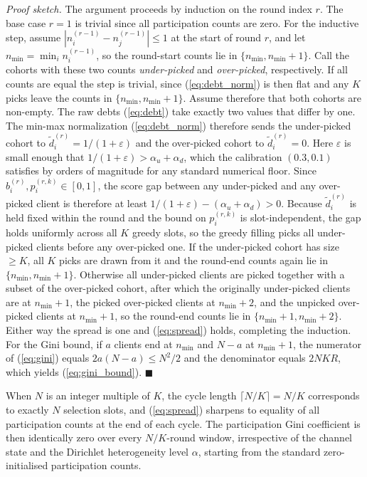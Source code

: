 \documentclass[journal]{IEEEtran}
\newcommand{\revIVE}[1]{#1}
\newcommand{\rev}[1]{{\color{blue}#1}}
\begin{document}
\textit{Proof sketch.} The argument proceeds by induction on the round index $r$. The base case $r = 1$ is trivial since all participation counts are zero. For the inductive step, assume $|n_i^{(r-1)} - n_j^{(r-1)}| \le 1$ at the start of round $r$, and let $n_{\min} = \min_i n_i^{(r-1)}$, so the round-start counts lie in $\{n_{\min}, n_{\min}+1\}$. Call the cohorts with these two counts \emph{under-picked} and \emph{over-picked}, respectively. \rev{If all counts are equal the step is trivial, since (\ref{eq:debt_norm}) is then flat and any $K$ picks leave the counts in $\{n_{\min}, n_{\min}+1\}$. Assume therefore that both cohorts are non-empty.} The raw debts (\ref{eq:debt}) take exactly two values that differ by one. The min-max normalization (\ref{eq:debt_norm}) therefore sends the under-picked cohort to $\tilde{d}_i^{(r)} = 1/(1+\varepsilon)$ and the over-picked cohort to $\tilde{d}_i^{(r)} = 0$. \revIVE{Here $\varepsilon$ is small enough that $1/(1+\varepsilon) > \alpha_u + \alpha_d$, which the calibration $(0.3, 0.1)$ satisfies by orders of magnitude for any standard numerical floor.} Since $b_i^{(r)}, p_i^{(r,k)} \in [0,1]$, the score gap between any under-picked and any over-picked client is therefore at least $1/(1+\varepsilon) - (\alpha_u + \alpha_d) > 0$. \revIVE{Because $\tilde{d}_i^{(r)}$ is held fixed within the round and the bound on $p_i^{(r,k)}$ is slot-independent, the gap holds uniformly across all $K$ greedy slots,} so the greedy filling picks all under-picked clients before any over-picked one. If the under-picked cohort has size $\ge K$, all $K$ picks are drawn from it and the round-end counts again lie in $\{n_{\min}, n_{\min}+1\}$. Otherwise all under-picked clients are picked together with a subset of the over-picked cohort, after which the originally under-picked clients are at $n_{\min}+1$, the picked over-picked clients at $n_{\min}+2$, and the unpicked over-picked clients at $n_{\min}+1$, so the round-end counts lie in $\{n_{\min}+1, n_{\min}+2\}$. Either way the spread is one and (\ref{eq:spread}) holds, completing the induction. For the Gini bound, if $a$ clients end at $n_{\min}$ and $N-a$ at $n_{\min}+1$, the numerator of (\ref{eq:gini}) equals $2a(N-a) \le N^2/2$ and the denominator equals $2NKR$, which yields (\ref{eq:gini_bound}). \hfill$\blacksquare$

When $N$ is an integer multiple of $K$, the cycle length $\lceil N/K \rceil = N/K$ corresponds to exactly $N$ selection slots, and (\ref{eq:spread}) sharpens to equality of all participation counts at the end of each cycle. The participation Gini coefficient is then identically zero over every $N/K$-round window, irrespective of the channel state and the Dirichlet heterogeneity level $\alpha$, starting from the standard zero-initialised participation counts.
\end{document}
